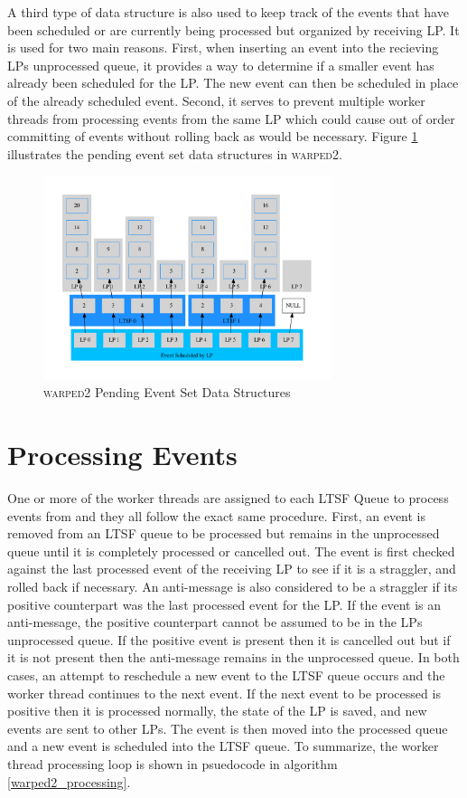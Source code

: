 \documentclass[11pt]{book}
\begin{document}
A third type of data structure is also used to keep track of the events that have been
scheduled or are currently being processed but organized by receiving LP.  It is used for
two main reasons.  First, when inserting an event into the recieving LPs unprocessed queue, it
provides a way to determine if a smaller event has already been scheduled for the LP.  The new
event can then be scheduled in place of the already scheduled event.  Second, it serves to
prevent multiple worker threads from processing events from the same LP which could cause
out of order committing of events without rolling back as would be necessary.
Figure \ref{pending_event_set} illustrates the pending event set data structures in
\textsc{warped2}.

\begin{figure}
    \centering
    \includegraphics[width=0.75\textwidth,quiet]{figs/graphviz/pending_event_set.pdf}
    \caption{\textsc{warped2} Pending Event Set Data Structures}\label{pending_event_set}
\end{figure}

\section{Processing Events}

One or more of the worker threads are assigned to each LTSF Queue to process events from
and they all follow the exact same procedure.  First, an event is removed from an LTSF
queue to be processed but remains in the unprocessed queue until it is completely processed or
cancelled out.  The event is first checked against the last processed event of the receiving LP
to see if it is a straggler, and rolled back if necessary.  An anti-message is also considered to
be a straggler if its positive counterpart was the last processed event for the LP.
If the event is an anti-message, the positive counterpart cannot be assumed to be in the LPs
unprocessed queue.  If the positive event is present then it is cancelled out but if it is not
present then the anti-message remains in the unprocessed queue.  In both cases, an attempt to
reschedule a new event to the LTSF queue occurs and the worker thread continues to the next
event.  If the next event to be processed is positive then it is processed normally, the state
of the LP is saved, and new events are sent to other LPs.  The event is then moved into the
processed queue and a new event is scheduled into the LTSF queue.  To summarize, the worker
thread processing loop is shown in psuedocode in algorithm \ref{warped2_processing}.
\end{document}

